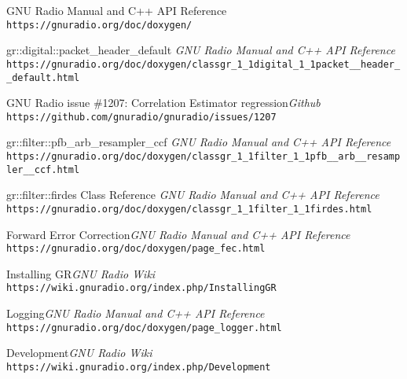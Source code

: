 \begin{thebibliography}{9}
 
 
GNU Radio Manual and C++ API Reference
\\\texttt{\small https://gnuradio.org/doc/doxygen/}

gr::digital::packet\_header\_default \quad \textit{ GNU Radio Manual and C++ API Reference }
\\\texttt{\footnotesize https://gnuradio.org/doc/doxygen/classgr\_1\_1digital\_1\_1packet\_\_header\_\_default.html}

{GNU Radio issue \#1207: {Correlation Estimator regression}}\quad \textit{Github}
\\\texttt{\small https://github.com/gnuradio/gnuradio/issues/1207}



gr::filter::pfb\_arb\_resampler\_ccf \quad  \textit{GNU Radio Manual and C++ API Reference}
\\\texttt{\footnotesize https://gnuradio.org/doc/doxygen/classgr\_1\_1filter\_1\_1pfb\_\_arb\_\_resampler\_\_ccf.html}



gr::filter::firdes Class Reference \quad  \textit{GNU Radio Manual and C++ API Reference}
\\\texttt{\footnotesize https://gnuradio.org/doc/doxygen/classgr\_1\_1filter\_1\_1firdes.html}



Forward Error Correction\quad \textit{GNU Radio Manual and C++ API Reference}
\\\texttt{\small https://gnuradio.org/doc/doxygen/page\_fec.html}


Installing GR\quad \textit{GNU Radio Wiki}
\\\texttt{\small https://wiki.gnuradio.org/index.php/InstallingGR}

Logging\quad \textit{GNU Radio Manual and C++ API Reference}
\\\texttt{\small https://gnuradio.org/doc/doxygen/page\_logger.html}

Development\quad \textit{GNU Radio Wiki}
\\\texttt{\small https://wiki.gnuradio.org/index.php/Development}



\end{thebibliography}